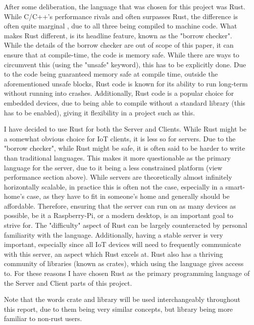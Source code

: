 After some deliberation, the language that was chosen for this project was Rust. While C/C++'s performance rivals and often surpasses Rust, the difference is often quite marginal \cite{PerformanceEvalOnMicrocontroller}, due to all three being compiled to machine code. What makes Rust different, is its headline feature, known as the "borrow checker". While the details of the borrow checker are out of scope of this paper, it can ensure that at compile-time, the code is memory safe. While there are ways to circumvent this (using the "unsafe" keyword), this has to be explicitly done. Due to the code being guaranteed memory safe at compile time, outside the aforementioned unsafe blocks, Rust code is known for its ability to run long-term without running into crashes. Additionally, Rust code is a popular choice for embedded devices, due to being able to compile without a standard library (this has to be enabled), giving it flexibility in a project such as this.

I have decided to use Rust for both the Server and Clients. While Rust might be a somewhat obvious choice for IoT clients, it is less so for servers. Due to the "borrow checker", while Rust might be safe, it is often said to be harder to write than traditional languages. This makes it more questionable as the primary language for the server, due to it being a less constrained platform (view performance section above). While servers are theoretically almost infinitely horizontally scalable, in practice this is often not the case, especially in a smart-home's case, as they have to fit in someone's home and generally should be affordable. Therefore, ensuring that the server can run on as many devices as possible, be it a Raspberry-Pi, or a modern desktop, is an important goal to strive for. The "difficulty" aspect of Rust can be largely counteracted by personal familiarity with the language. Additionally, having a stable server is very important, especially since all IoT devices will need to frequently communicate with this server, an aspect which Rust excels at. Rust also has a thriving community of libraries (known as crates), which using the language gives access to. For these reasons I have chosen Rust as the primary programming language of the Server and Client parts of this project.

Note that the words crate and library will be used interchangeably throughout this report, due to them being very similar concepts, but library being more familiar to non-rust users. 

